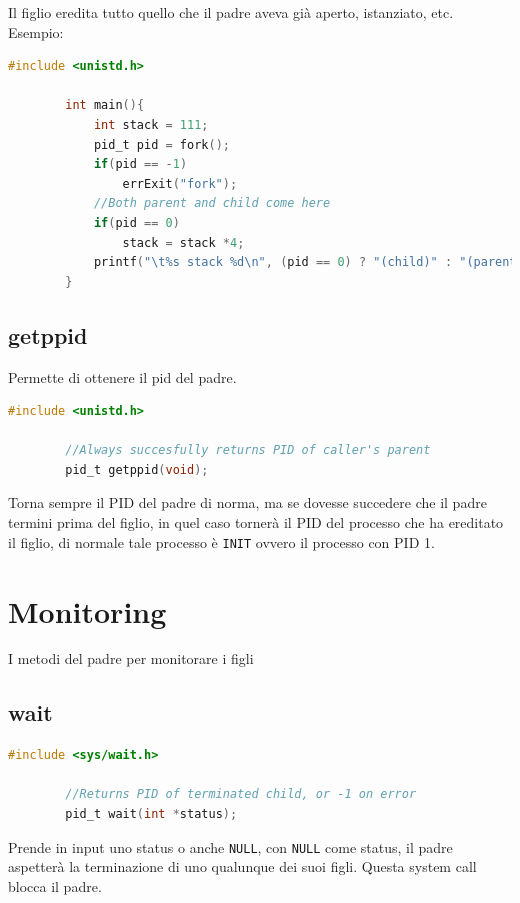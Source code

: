 \documentclass[a4paper, 12pt]{book}
\begin{document}
    Il figlio eredita tutto quello che il padre aveva già aperto, istanziato, etc.
    Esempio:
    \begin{lstlisting}[language=C]
        #include <unistd.h>
        
        int main(){
            int stack = 111;
            pid_t pid = fork();
            if(pid == -1)
                errExit("fork");
            //Both parent and child come here 
            if(pid == 0)
                stack = stack *4;
            printf("\t%s stack %d\n", (pid == 0) ? "(child)" : "(parent)", stack);
        }
    \end{lstlisting}
    
    \subsection{getppid}

    Permette di ottenere il pid del padre.
    \begin{lstlisting}[language=C]
        #include <unistd.h>

        //Always succesfully returns PID of caller's parent 
        pid_t getppid(void);
    \end{lstlisting}
    Torna sempre il PID del padre di norma, ma se dovesse succedere 
    che il padre termini prima del figlio, in quel caso tornerà il PID del 
    processo che ha ereditato il figlio, di normale tale processo è \verb|INIT| 
    ovvero il processo con PID 1.

    \section{Monitoring}

    I metodi del padre per monitorare i figli 

    \subsection{wait}

    \begin{lstlisting}[language=C]
        #include <sys/wait.h>

        //Returns PID of terminated child, or -1 on error 
        pid_t wait(int *status);
    \end{lstlisting}
    Prende in input uno status o anche \verb|NULL|, con \verb|NULL| come 
    status, il padre aspetterà la terminazione di uno qualunque dei suoi 
    figli. Questa system call blocca il padre.
\end{document}
